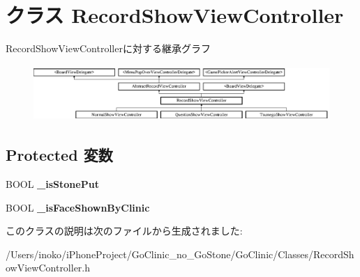 \hypertarget{interface_record_show_view_controller}{
\section{クラス RecordShowViewController}
\label{interface_record_show_view_controller}
}
RecordShowViewControllerに対する継承グラフ\begin{figure}[H]
\begin{center}
\leavevmode
\includegraphics[height=2.129278cm]{interface_record_show_view_controller}
\end{center}
\end{figure}
\subsection*{Protected 変数}
\begin{DoxyCompactItemize}
\item 
\hypertarget{interface_record_show_view_controller_a90f039e162a2d1b038cdeebec237f007}{
BOOL {\bfseries \_\-isStonePut}}
\label{interface_record_show_view_controller_a90f039e162a2d1b038cdeebec237f007}

\item 
\hypertarget{interface_record_show_view_controller_a6eb486f0ca633618550a426cf26ac9ca}{
BOOL {\bfseries \_\-isFaceShownByClinic}}
\label{interface_record_show_view_controller_a6eb486f0ca633618550a426cf26ac9ca}

\end{DoxyCompactItemize}


このクラスの説明は次のファイルから生成されました:\begin{DoxyCompactItemize}
\item 
/Users/inoko/iPhoneProject/GoClinic\_\-no\_\-GoStone/GoClinic/Classes/RecordShowViewController.h\end{DoxyCompactItemize}

